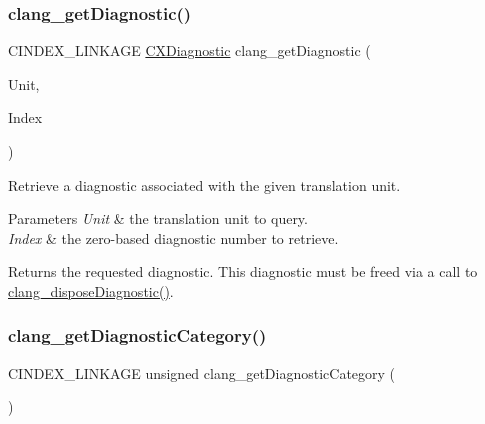 \subsubsection{\texorpdfstring{clang\+\_\+get\+Diagnostic()}{clang\_getDiagnostic()}}
{\footnotesize\ttfamily C\+I\+N\+D\+E\+X\+\_\+\+L\+I\+N\+K\+A\+GE \mbox{\hyperlink{group__CINDEX__DIAG_ga44bb8aba7c40590ad25d1763c4fbff7f}{C\+X\+Diagnostic}} clang\+\_\+get\+Diagnostic (\begin{DoxyParamCaption}\item[{\mbox{\hyperlink{group__CINDEX_gacdb7815736ca709ce9a5e1ec2b7e16ac}{C\+X\+Translation\+Unit}}}]{Unit,  }\item[{unsigned}]{Index }\end{DoxyParamCaption})}



Retrieve a diagnostic associated with the given translation unit. 


\begin{DoxyParams}{Parameters}
{\em Unit} & the translation unit to query. \\
\hline
{\em Index} & the zero-\/based diagnostic number to retrieve.\\
\hline
\end{DoxyParams}
\begin{DoxyReturn}{Returns}
the requested diagnostic. This diagnostic must be freed via a call to {\ttfamily \mbox{\hyperlink{group__CINDEX__DIAG_ga07061e0ad7665b7c5ee7253cd1bf4a5c}{clang\+\_\+dispose\+Diagnostic()}}}. 
\end{DoxyReturn}
\mbox{\label{group__CINDEX__DIAG_ga0ec085bd59b8b6c935eab0e53a1f348f}} 
\subsubsection{\texorpdfstring{clang\+\_\+get\+Diagnostic\+Category()}{clang\_getDiagnosticCategory()}}
{\footnotesize\ttfamily C\+I\+N\+D\+E\+X\+\_\+\+L\+I\+N\+K\+A\+GE unsigned clang\+\_\+get\+Diagnostic\+Category (\begin{DoxyParamCaption}\item[{\mbox{\hyperlink{group__CINDEX__DIAG_ga44bb8aba7c40590ad25d1763c4fbff7f}{C\+X\+Diagnostic}}}]{ }\end{DoxyParamCaption})}



